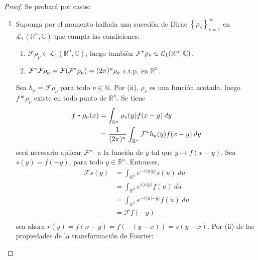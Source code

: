 \documentclass[12pt]{report}
\theoremstyle{largebreak}
\newcommand\pint[2]{\ensuremath{\langle#1| #2\rangle}}
\newcommand{\fou}[1]{\ensuremath{\mathcal{F}#1}}
\begin{document}
    \begin{proof}
        Se probará por casos:
        \begin{enumerate}
            \item Suponga por el momento hallada una sucesión de Dirac $\left\{\rho_\nu\right\}_{\nu=1}^\infty$ en $\mathcal{L}_1(\mathbb{R}^n,\mathbb{C})$ que cumpla las condiciones:
            \begin{enumerate}
                \item $\fou{\rho_\nu}\in\mathcal{L}_1(\mathbb{R}^n,\mathbb{C})$, luego también $\fou^*{\rho_\nu}\in\mathcal{L}_1(\mathbb{R}^n,\mathbb{C})$.
                \item $\fou^*{\fou{\rho_\nu}}=\fou{(\fou^*{\rho_\nu})}=(2\pi)^n\rho_\nu$ c.t.p. en $\mathbb{R}^n$.
            \end{enumerate}
            Sea $h_\nu=\fou{\rho_\nu}$ para todo $\nu\in\mathbb{N}$. Por (ii), $\rho_\nu$ es una función acotada, luego $f*\rho_\nu$ existe en todo punto de $\mathbb{R}^n$. Se tiene
            \begin{equation*}
                \begin{split}
                    f*\rho_\nu(x)&=\int_{\mathbb{R}^n}\rho_\nu(y)f(x-y)\:dy\\
                    &=\frac{1}{(2\pi)^n}\int_{\mathbb{R}^n}\fou^*{h_\nu}(y)f(x-y)\:dy\\
                \end{split}
            \end{equation*}
            será necesario aplicar $\fou^*{\cdot}$ a la función de $y$ tal que $y\mapsto f(x-y)$. Sea $s(y)=f(-y)$, para todo $y\in\mathbb{R}^n$. Entonces,
            \begin{equation*}
                \begin{split}
                    \fou{s}(y)&=\int_{\mathbb{R}^n}e^{ -i\pint{u}{y}}s(u)\:du\\
                    &=\int_{\mathbb{R}^n}e^{i\pint{u}{y}}f(u)\:du\\
                    &=\int_{\mathbb{R}^n}e^{-i\pint{u}{-y}}f(u)\:du\\
                    &=\fou{f}(-y)\\
                \end{split}
            \end{equation*}
            sea ahora $r(y)=f(x-y)=f(-(y-x))=s(y-x)$. Por (ii) de las propiedades de la transformación de Fourier:
            \begin{equation*}

\end{equation*}
\end{enumerate}
\end{proof}
\end{document}
